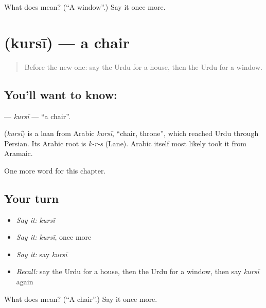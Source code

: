 \begin{tcolorbox}[breakable,colback=teal!4,colframe=teal!35!black,title={Before you move on}]
What does  mean? (\textquotedblleft{}A window\textquotedblright{}.) Say it once more.
\end{tcolorbox}
\section[\texorpdfstring{\ur{کرسی} (kursī)}{کرسی (kursī)}]{ (kursī) — a chair}

\label{lesson:UR-C58-kursi}



\begin{quote}
Before the new one: say the Urdu for a house, then the Urdu for a window.
\end{quote}

\subsection*{You'll want to know: }
\textbf{} — \emph{kursī} — \textquotedblleft{}a chair\textquotedblright{}.

\begin{cousinweb}
\textbf{} (\emph{kursī}) is a loan from Arabic \emph{kursī}, \textquotedblleft{}chair, throne\textquotedblright{}, which reached Urdu through Persian. Its Arabic root is \emph{k-r-s} (Lane). Arabic itself most likely took it from Aramaic.
\end{cousinweb}

\begin{grammarlens}[title={What you've built}]
One more word for this chapter.
\end{grammarlens}

\subsection*{Your turn}
\begin{itemize}
\raggedright
  \item \emph{Say it:} \emph{kursī}
  \item \emph{Say it:} \emph{kursī}, once more
  \item \emph{Say it:} say \emph{kursī}
  \item \emph{Recall:} say the Urdu for a house, then the Urdu for a window, then say \emph{kursī} again
\end{itemize}

\begin{tcolorbox}[breakable,colback=teal!4,colframe=teal!35!black,title={Before you move on}]
What does  mean? (\textquotedblleft{}A chair\textquotedblright{}.) Say it once more.
\end{tcolorbox}
